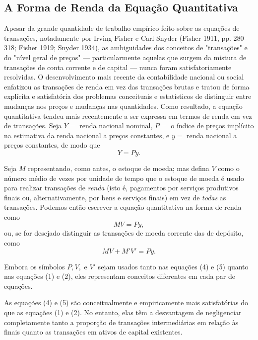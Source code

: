 \documentclass[12pt]{article}
\begin{document}
\subsection{A Forma de Renda da Equação Quantitativa}

Apesar da grande quantidade de trabalho empírico feito sobre as equações de transações, notadamente por Irving Fisher e Carl Snyder (Fisher 1911, pp. 280–318; Fisher 1919; Snyder 1934), as ambiguidades dos conceitos de "transações" e do "nível geral de preços" — particularmente aquelas que surgem da mistura de transações de conta corrente e de capital — nunca foram satisfatoriamente resolvidas. O desenvolvimento mais recente da contabilidade nacional ou social enfatizou as transações de renda em vez das transações brutas e tratou de forma explícita e satisfatória dos problemas conceituais e estatísticos de distinguir entre mudanças nos preços e mudanças nas quantidades. Como resultado, a equação quantitativa tendeu mais recentemente a ser expressa em termos de renda em vez de transações. Seja $Y = $ renda nacional nominal, $P = $ o índice de preços implícito na estimativa da renda nacional a preços constantes, e $y = $ renda nacional a preços constantes, de modo que
\begin{equation}
Y = Py.
\end{equation}

Seja $M$ representando, como antes, o estoque de moeda; mas defina $V$ como o número médio de vezes por unidade de tempo que o estoque de moeda é usado para realizar transações de \textit{renda} (isto é, pagamentos por serviços produtivos finais ou, alternativamente, por bens e serviços finais) em vez de \textit{todas} as transações. Podemos então escrever a equação quantitativa na forma de renda como
\begin{equation}
MV = Py,
\end{equation}
ou, se for desejado distinguir as transações de moeda corrente das de depósito, como
\begin{equation}
MV + M'V' = Py.
\end{equation}

Embora os símbolos $P, V,$ e $V'$ sejam usados tanto nas equações (4) e (5) quanto nas equações (1) e (2), eles representam conceitos diferentes em cada par de equações.

As equações (4) e (5) são conceitualmente e empiricamente mais satisfatórias do que as equações (1) e (2). No entanto, elas têm a desvantagem de negligenciar completamente tanto a proporção de transações intermediárias em relação às finais quanto as transações em ativos de capital existentes.
\end{document}
